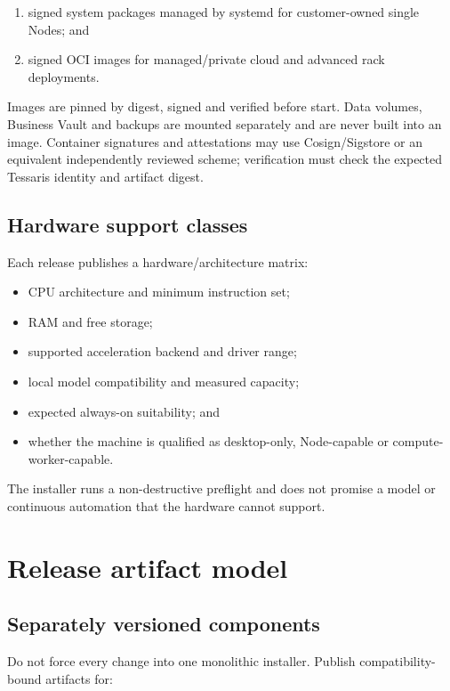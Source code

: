 \documentclass[11pt]{article}
\begin{document}
\begin{enumerate}
  \item signed system packages managed by systemd for customer-owned single Nodes; and
  \item signed OCI images for managed/private cloud and advanced rack deployments.
\end{enumerate}

Images are pinned by digest, signed and verified before start. Data volumes, Business Vault and backups are mounted separately and are never built into an image. Container signatures and attestations may use Cosign/Sigstore or an equivalent independently reviewed scheme; verification must check the expected Tessaris identity and artifact digest.

\subsection{Hardware support classes}

Each release publishes a hardware/architecture matrix:

\begin{itemize}
  \item CPU architecture and minimum instruction set;
  \item RAM and free storage;
  \item supported acceleration backend and driver range;
  \item local model compatibility and measured capacity;
  \item expected always-on suitability; and
  \item whether the machine is qualified as desktop-only, Node-capable or compute-worker-capable.
\end{itemize}

The installer runs a non-destructive preflight and does not promise a model or continuous automation that the hardware cannot support.

\section{Release artifact model}

\subsection{Separately versioned components}

Do not force every change into one monolithic installer. Publish compatibility-bound artifacts for:
\end{document}
